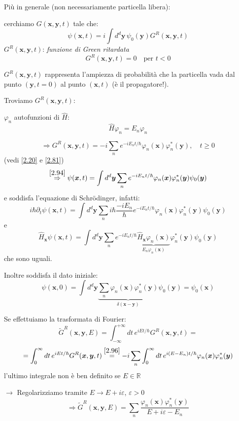 \documentclass[a4paper,11pt]{report}
\newcommand{\R}{\mathbb{R}}
\newcommand{\x}{\boldsymbol{x}}
\newcommand{\y}{\boldsymbol{y}}
\begin{document}
Pi\`u in generale (non necessariamente particella libera):

cerchiamo $G(\x,\y,t)$ tale che:
\begin{equation}
\psi(\x,t)=i\int d^d\y\, \psi_0(\y) G^R(\x,\y,t)
\label{2.94}
\end{equation}
$G^R(\x,\y,t)$: \emph{funzione di Green ritardata}
\[
G^R(\x,\y,t)=0 \quad \text{per }t<0
\] 

$G^R(\x,\y,t)$ rappresenta l'ampiezza di probabilit\`a che la particella vada dal punto \mbox{$(\y,t=0)$} al punto $(\x,t)$ (\`e il propagatore!).

\smallskip

Troviamo $G^R(\x,\y,t)$:

$\varphi_n$ autofunzioni di $\hat{H}$:
\begin{equation}
\hat{H}\varphi_n=E_n \varphi_n 
\label{2.95}
\end{equation}

\begin{equation}
\Rightarrow G^R(\x,\y,t)=-i\sum_n e^{-iE_nt/\hbar}\varphi_n(\x)\varphi_n^* (\y), \quad t\geq 0
\label{2.96}
\end{equation}
(vedi \eqref{2.20} e \eqref{2.81})
\[
\overset{\eqref{2.94}}{\Rightarrow} \psi(\x,t)=\int d^d\y \sum_n e^{-iE_nt/\hbar}\varphi_n(\x)\varphi_n^* (\y)\psi_0(\y)
\]
e soddisfa l'equazione di Schr\"odinger, infatti:
\[
i\hbar\partial_t\psi(\x,t)=\int d^d\y \sum_n i\hbar \frac{-iE_n}{\hbar} e^{-iE_nt/\hbar}\varphi_n(\x)\varphi_n^* (\y)\psi_0(\y)
\]
e
\[
\hat{H}_{\x}\psi(\x,t)=\int d^d\y \sum_n e^{-iE_nt/\hbar}\underbrace{\hat{H}_{\x}\varphi_n(\x)}_{E_n\varphi_n(\x)} \varphi_n^* (\y)\psi_0(\y)
\]
che sono uguali.

Inoltre soddisfa il dato iniziale:
\[
\psi(\x,0)=\int d^d\y \underbrace{\sum_n \varphi_n(\x)\varphi_n^* (\y)}_{\delta(\x-\y)} \psi_0(\y)=\psi_0(\x)
\]

Se effettuiamo la trasformata di Fourier:
\[
\tilde{G}^R(\x,\y,E)=\int_{-\infty}^{+\infty}dt\, e^{iEt/\hbar}G^R(\x,\y,t)= 
\]
\[
=\int_0^\infty dt\, e^{iEt/\hbar}G^R(\x,\y,t)\overset{\eqref{2.96}}{=}-i\sum_n\int_0^\infty dt\, e^{i(E-E_n)t/\hbar}\varphi_n(\x)\varphi_n^*(\y)
\]
l'ultimo integrale non \`e ben definito se $E\in \R$ 

$\rightarrow$ Regolarizziamo tramite $E\to E+i\varepsilon$, $\varepsilon >0$
\begin{equation}
\Rightarrow \tilde{G}^R(\x,\y,E)=\sum_n\frac{\varphi_n(\x)\varphi_n^*(\y)}{E+i\varepsilon - E_n}
\label{2.97}
\end{equation}
\end{document}
